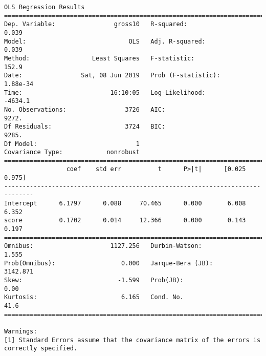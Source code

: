 \documentclass[11pt]{article}
\begin{document}
    \begin{Verbatim}[commandchars=\\\{\}]
                            OLS Regression Results                            
==============================================================================
Dep. Variable:                gross10   R-squared:                       0.039
Model:                            OLS   Adj. R-squared:                  0.039
Method:                 Least Squares   F-statistic:                     152.9
Date:                Sat, 08 Jun 2019   Prob (F-statistic):           1.88e-34
Time:                        16:10:05   Log-Likelihood:                -4634.1
No. Observations:                3726   AIC:                             9272.
Df Residuals:                    3724   BIC:                             9285.
Df Model:                           1                                         
Covariance Type:            nonrobust                                         
==============================================================================
                 coef    std err          t      P>|t|      [0.025      0.975]
------------------------------------------------------------------------------
Intercept      6.1797      0.088     70.465      0.000       6.008       6.352
score          0.1702      0.014     12.366      0.000       0.143       0.197
==============================================================================
Omnibus:                     1127.256   Durbin-Watson:                   1.555
Prob(Omnibus):                  0.000   Jarque-Bera (JB):             3142.871
Skew:                          -1.599   Prob(JB):                         0.00
Kurtosis:                       6.165   Cond. No.                         41.6
==============================================================================

Warnings:
[1] Standard Errors assume that the covariance matrix of the errors is correctly specified.

    \end{Verbatim}
\end{document}
